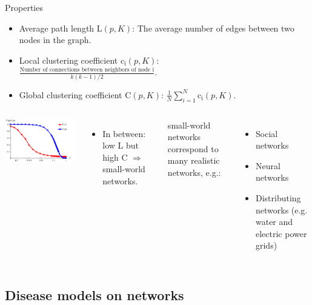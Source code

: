 \documentclass[blackandwhite]{beamer}
\begin{document}
\begin{frame}{Properties}
	\begin{itemize}
	\item
	Average path length L$(p,K)$: The average number of edges between two nodes in the graph.
	\item 
	Local clustering coefficient c$_{\text{i}}(p,K)$:\\
	\vspace{3mm}
	$\frac{\text{Number of connections between neighbors of node i}}{k(k-1)/2}$.
	\item
	Global clustering coefficient C$(p,K)$: $\frac{1}{N} \sum_{i = 1}^{N} $c$_{\text{i}}(p,K)$.
        \end{itemize}
        \begin{columns}[T]
	\begin{center}
	\includegraphics[scale=0.7]{lpcp.pdf}
	\end{center}
	\begin{itemize}
	\item
	In between: low L but high C $\Rightarrow$ small-world networks.
	\end{itemize}
	small-world networks correspond to many realistic networks, e.g.:
	\begin{itemize}
	\item
	Social networks
	\item
	Neural networks
	\item
	Distributing networks (e.g. water and electric power grids)
	\end{itemize}
        \end{columns}
\end{frame}

\subsection{Disease models on networks}
\end{document}
